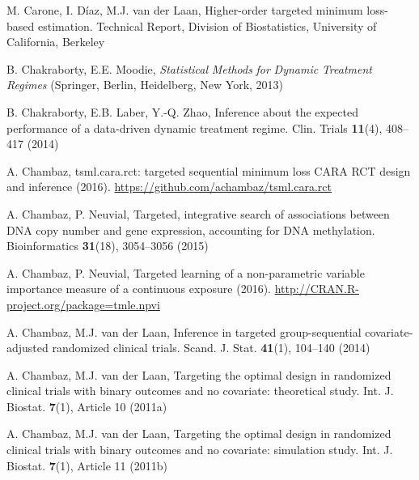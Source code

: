 \begin{list}{}{\setlength{\leftmargin}{2.1em}\setlength{\labelwidth}{0pt}
  \setlength{\labelsep}{0pt}\setlength{\itemindent}{-2.1em}
  \setlength{\parsep}{0pt}\setlength{\itemsep}{2pt}\setlength{\topsep}{0pt}}
\item\label{refentry:REF053}M. Carone, I. Díaz, M.J. van der Laan, Higher-order targeted minimum loss-based estimation. Technical Report, Division of Biostatistics, University of California, Berkeley\label{refend:REF053}
\item\label{refentry:REF054}B. Chakraborty, E.E. Moodie, \textit{Statistical} \textit{Methods} \textit{for} \textit{Dynamic} \textit{Treatment} \textit{Regimes} (Springer, Berlin, Heidelberg, New York, 2013)\label{refend:REF054}
\item\label{refentry:REF055}B. Chakraborty, E.B. Laber, Y.-Q. Zhao, Inference about the expected performance of a data-driven dynamic treatment regime. Clin. Trials \textbf{11}(4), 408--417 (2014)\label{refend:REF055}
\item\label{refentry:REF056}A. Chambaz, tsml.cara.rct: targeted sequential minimum loss CARA RCT design and inference (2016). \url{https://github.com/achambaz/tsml.cara.rct}\label{refend:REF056}
\item\label{refentry:REF057}A. Chambaz, P. Neuvial, Targeted, integrative search of associations between DNA copy number and gene expression, accounting for DNA methylation. Bioinformatics \textbf{31}(18), 3054--3056 (2015)\label{refend:REF057}
\item\label{refentry:REF058}A. Chambaz, P. Neuvial, Targeted learning of a non-parametric variable importance measure of a continuous exposure (2016). \url{http://CRAN.R-project.org/package=tmle.npvi}\label{refend:REF058}
\item\label{refentry:REF059}A. Chambaz, M.J. van der Laan, Inference in targeted group-sequential covariate-adjusted randomized clinical trials. Scand. J. Stat. \textbf{41}(1), 104--140 (2014)\label{refend:REF059}
\item\label{refentry:REF060}A. Chambaz, M.J. van der Laan, Targeting the optimal design in randomized clinical trials with binary outcomes and no covariate: theoretical study. Int. J. Biostat. \textbf{7}(1), Article 10 (2011a)\label{refend:REF060}
\item\label{refentry:REF061}A. Chambaz, M.J. van der Laan, Targeting the optimal design in randomized clinical trials with binary outcomes and no covariate: simulation study. Int. J. Biostat. \textbf{7}(1), Article 11 (2011b)\label{refend:REF061}

\end{list}
